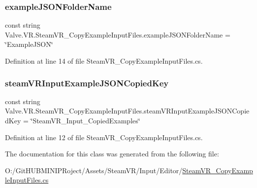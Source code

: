\subsubsection{\texorpdfstring{exampleJSONFolderName}{exampleJSONFolderName}}
{\footnotesize\ttfamily const string Valve.\+V\+R.\+Steam\+V\+R\+\_\+\+Copy\+Example\+Input\+Files.\+example\+J\+S\+O\+N\+Folder\+Name = \char`\"{}Example\+J\+S\+ON\char`\"{}}



Definition at line 14 of file Steam\+V\+R\+\_\+\+Copy\+Example\+Input\+Files.\+cs.

\mbox{\label{class_valve_1_1_v_r_1_1_steam_v_r___copy_example_input_files_a684bbe28279285b6c21da7f8b7928322}} 
\subsubsection{\texorpdfstring{steamVRInputExampleJSONCopiedKey}{steamVRInputExampleJSONCopiedKey}}
{\footnotesize\ttfamily const string Valve.\+V\+R.\+Steam\+V\+R\+\_\+\+Copy\+Example\+Input\+Files.\+steam\+V\+R\+Input\+Example\+J\+S\+O\+N\+Copied\+Key = \char`\"{}Steam\+V\+R\+\_\+\+Input\+\_\+\+Copied\+Examples\char`\"{}}



Definition at line 12 of file Steam\+V\+R\+\_\+\+Copy\+Example\+Input\+Files.\+cs.



The documentation for this class was generated from the following file\+:\begin{DoxyCompactItemize}
\item 
O\+:/\+Git\+H\+U\+B\+M\+I\+N\+I\+P\+Roject/\+Assets/\+Steam\+V\+R/\+Input/\+Editor/\mbox{\hyperlink{_steam_v_r___copy_example_input_files_8cs}{Steam\+V\+R\+\_\+\+Copy\+Example\+Input\+Files.\+cs}}\end{DoxyCompactItemize}
